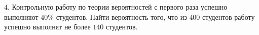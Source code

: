\documentclass[12pt,a4paper]{article}
\begin{document}
\noindent$4.$ Контрольную работу по теории вероятностей с первого раза успешно
выполняют $40\%$ студентов. Найти вероятность того, что из $400$ студентов
работу успешно выполнят не более $140$ студентов.

\begin{center}
\end{center}
\end{document}
